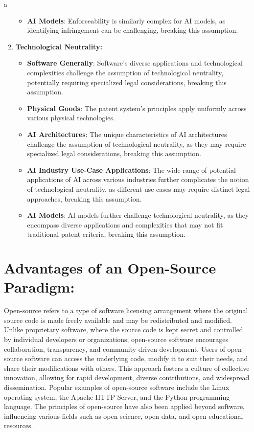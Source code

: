 a\documentclass{article}[10pt]
\begin{document}
\begin{enumerate}
\begin{itemize}
    	\item \textbf{AI Models}: Enforceability is similarly complex for AI models, as identifying infringement can be challenging, breaking this assumption.
    \end{itemize}
    \item \textbf{Technological Neutrality:}
    \begin{itemize}
    	\item \textbf{Software Generally}: Software's diverse applications and technological complexities challenge the assumption of technological neutrality, potentially requiring specialized legal considerations, breaking this assumption.
    	\item \textbf{Physical Goods}: The patent system's principles apply uniformly across various physical technologies.
    	\item \textbf{AI Architectures}: The unique characteristics of AI architectures challenge the assumption of technological neutrality, as they may require specialized legal considerations, breaking this assumption.
    	\item \textbf{AI Industry Use-Case Applications}: The wide range of potential applications of AI across various industries further complicates the notion of technological neutrality, as different use-cases may require distinct legal approaches, breaking this assumption.
    	\item \textbf{AI Models}: AI models further challenge technological neutrality, as they encompass diverse applications and complexities that may not fit traditional patent criteria, breaking this assumption.
    \end{itemize}
\end{enumerate}

\section{Advantages of an Open-Source Paradigm:}

Open-source refers to a type of software licensing arrangement where the original source code is made freely available and may be redistributed and modified. Unlike proprietary software, where the source code is kept secret and controlled by individual developers or organizations, open-source software encourages collaboration, transparency, and community-driven development. Users of open-source software can access the underlying code, modify it to suit their needs, and share their modifications with others. This approach fosters a culture of collective innovation, allowing for rapid development, diverse contributions, and widespread dissemination. Popular examples of open-source software include the Linux operating system, the Apache HTTP Server, and the Python programming language. The principles of open-source have also been applied beyond software, influencing various fields such as open science, open data, and open educational resources.
\end{document}
